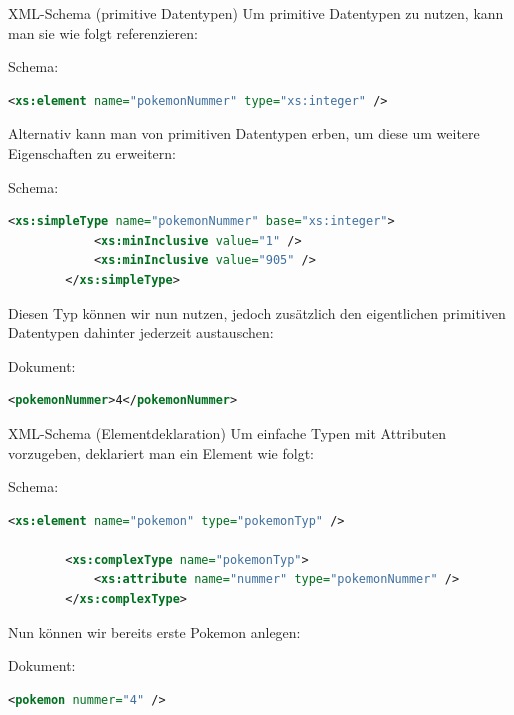 \begin{example}{XML-Schema (primitive Datentypen)}
    Um primitive Datentypen zu nutzen, kann man sie wie folgt referenzieren:
    
    Schema:
    \begin{lstlisting}[language=XML]
        <xs:element name="pokemonNummer" type="xs:integer" />
    \end{lstlisting}
    
    Alternativ kann man von primitiven Datentypen erben, um diese um weitere Eigenschaften zu erweitern:
    
    Schema:
    \begin{lstlisting}[language=XML]
        <xs:simpleType name="pokemonNummer" base="xs:integer">
            <xs:minInclusive value="1" />
            <xs:minInclusive value="905" />
        </xs:simpleType>
    \end{lstlisting}
    
    Diesen Typ können wir nun nutzen, jedoch zusätzlich den eigentlichen primitiven Datentypen dahinter jederzeit austauschen:
    
    Dokument:
    \begin{lstlisting}[language=XML]
        <pokemonNummer>4</pokemonNummer>
    \end{lstlisting}
\end{example}

\begin{example}{XML-Schema (Elementdeklaration)}
    Um einfache Typen mit Attributen vorzugeben, deklariert man ein Element wie folgt:
    
    Schema:
    \begin{lstlisting}[language=XML]
        <xs:element name="pokemon" type="pokemonTyp" />

        <xs:complexType name="pokemonTyp">
            <xs:attribute name="nummer" type="pokemonNummer" />
        </xs:complexType>
    \end{lstlisting}
    
    Nun können wir bereits erste Pokemon anlegen:
    
    Dokument:
    \begin{lstlisting}[language=XML]
        <pokemon nummer="4" />
    \end{lstlisting}
\end{example}

